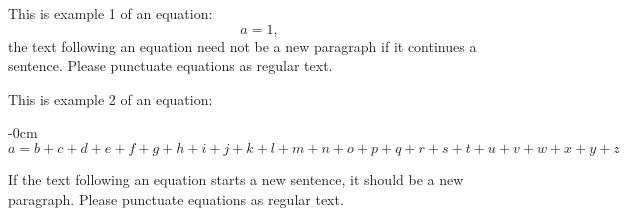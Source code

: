 \documentclass[journal,article,submit,moreauthors]{Definitions/mdpi}
\begin{document}
This is example 1 of an equation:
\begin{equation}
a = 1,
\end{equation}
the text following an equation need not be a new paragraph if it continues a sentence. Please punctuate equations as regular text.

This is example 2 of an equation:
\begin{adjustwidth}{-\extralength}{0cm}
\begin{equation}
a = b + c + d + e + f + g + h + i + j + k + l + m + n + o + p + q + r + s + t + u + v + w + x + y + z
\end{equation}
\end{adjustwidth}

If the text following an equation starts a new sentence, it should be a new paragraph. Please punctuate equations as regular text.

\end{document}
